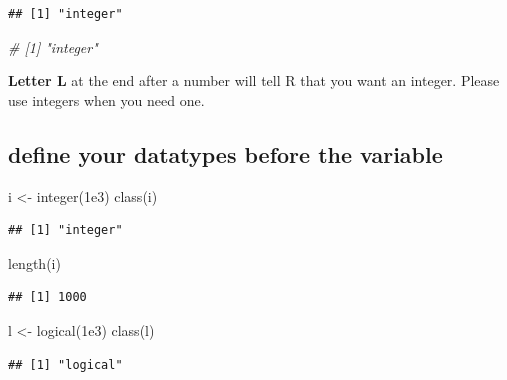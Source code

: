 \documentclass[
]{book}
\newenvironment{Shaded}{\begin{snugshade}}{\end{snugshade}}
\newcommand{\CommentTok}[1]{\textcolor[rgb]{0.56,0.35,0.01}{\textit{#1}}}
\newcommand{\FloatTok}[1]{\textcolor[rgb]{0.00,0.00,0.81}{#1}}
\newcommand{\FunctionTok}[1]{\textcolor[rgb]{0.00,0.00,0.00}{#1}}
\newcommand{\NormalTok}[1]{#1}
\newcommand{\OtherTok}[1]{\textcolor[rgb]{0.56,0.35,0.01}{#1}}
\begin{document}
\begin{verbatim}
## [1] "integer"
\end{verbatim}

\begin{Shaded}
\begin{Highlighting}[]
\CommentTok{\# [1] "integer"}
\end{Highlighting}
\end{Shaded}

\textbf{Letter L} at the end after a number will tell R that you want an integer. Please use integers when you need one.

\hypertarget{define-your-datatypes-before-the-variable}{%
\subsection{define your datatypes before the variable}\label{define-your-datatypes-before-the-variable}}

\begin{Shaded}
\begin{Highlighting}[]
\NormalTok{i }\OtherTok{\textless{}{-}} \FunctionTok{integer}\NormalTok{(}\FloatTok{1e3}\NormalTok{)}
\FunctionTok{class}\NormalTok{(i)}
\end{Highlighting}
\end{Shaded}

\begin{verbatim}
## [1] "integer"
\end{verbatim}

\begin{Shaded}
\begin{Highlighting}[]
\FunctionTok{length}\NormalTok{(i)}
\end{Highlighting}
\end{Shaded}

\begin{verbatim}
## [1] 1000
\end{verbatim}

\begin{Shaded}
\begin{Highlighting}[]
\NormalTok{l }\OtherTok{\textless{}{-}} \FunctionTok{logical}\NormalTok{(}\FloatTok{1e3}\NormalTok{)}
\FunctionTok{class}\NormalTok{(l)}
\end{Highlighting}
\end{Shaded}

\begin{verbatim}
## [1] "logical"
\end{verbatim}
\end{document}
